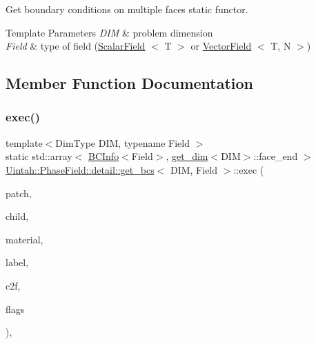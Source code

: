 Get boundary conditions on multiple faces static functor. 


\begin{DoxyTemplParams}{Template Parameters}
{\em D\+IM} & problem dimension \\
\hline
{\em Field} & type of field (\hyperlink{structUintah_1_1PhaseField_1_1ScalarField}{Scalar\+Field} $<$ T $>$ or \hyperlink{structUintah_1_1PhaseField_1_1VectorField}{Vector\+Field} $<$ T, N $>$) \\
\hline
\end{DoxyTemplParams}


\subsection{Member Function Documentation}
\mbox{\label{classUintah_1_1PhaseField_1_1detail_1_1get__bcs_aec2c358b09b48c57f06cc8ea48bd3205}} 
\subsubsection{\texorpdfstring{exec()}{exec()}}
{\footnotesize\ttfamily template$<$Dim\+Type D\+IM, typename Field $>$ \\
static std\+::array$<$ \hyperlink{structUintah_1_1PhaseField_1_1BCInfo}{B\+C\+Info}$<$Field$>$, \hyperlink{structUintah_1_1PhaseField_1_1get__dim}{get\+\_\+dim}$<$D\+IM$>$\+::face\+\_\+end $>$ \hyperlink{classUintah_1_1PhaseField_1_1detail_1_1get__bcs}{Uintah\+::\+Phase\+Field\+::detail\+::get\+\_\+bcs}$<$ D\+IM, Field $>$\+::exec (\begin{DoxyParamCaption}\item[{const Patch $\ast$}]{patch,  }\item[{const int \&}]{child,  }\item[{const int \&}]{material,  }\item[{const typename Field\+::label\+\_\+type \&}]{label,  }\item[{const std\+::map$<$ std\+::string, \hyperlink{namespaceUintah_1_1PhaseField_aeb51fe956fe07f1487f5878f4039f27c}{FC} $>$ $\ast$}]{c2f,  }\item[{std\+::array$<$ bool, \hyperlink{structUintah_1_1PhaseField_1_1get__dim}{get\+\_\+dim}$<$ D\+IM $>$\+::face\+\_\+end $>$ \&}]{flags }\end{DoxyParamCaption})\hspace{0.3cm}{\ttfamily [inline]}, {\ttfamily [static]}}



